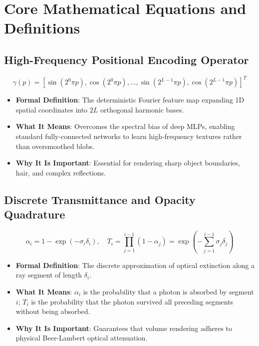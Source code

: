 \documentclass[11pt,a4paper]{article}
\theoremstyle{definition}
\begin{document}
\section{Core Mathematical Equations and Definitions}

\subsection{High-Frequency Positional Encoding Operator}
{\boldmath
\begin{equation}
\gamma(p) = \left[ \sin(2^0 \pi p), \cos(2^0 \pi p), \dots, \sin(2^{L-1} \pi p), \cos(2^{L-1} \pi p) \right]^T
\end{equation}
}
\begin{itemize}
    \item \textbf{Formal Definition}: The deterministic Fourier feature map expanding 1D spatial coordinates into $2L$ orthogonal harmonic bases.
    \item \textbf{What It Means}: Overcomes the spectral bias of deep MLPs, enabling standard fully-connected networks to learn high-frequency textures rather than oversmoothed blobs.
    \item \textbf{Why It Is Important}: Essential for rendering sharp object boundaries, hair, and complex reflections.
\end{itemize}

\subsection{Discrete Transmittance and Opacity Quadrature}
{\boldmath
\begin{equation}
\alpha_i = 1 - \exp(-\sigma_i \delta_i), \quad T_i = \prod_{j=1}^{i-1} (1 - \alpha_j) = \exp\left( -\sum_{j=1}^{i-1} \sigma_j \delta_j \right)
\end{equation}
}
\begin{itemize}
    \item \textbf{Formal Definition}: The discrete approximation of optical extinction along a ray segment of length $\delta_i$.
    \item \textbf{What It Means}: $\alpha_i$ is the probability that a photon is absorbed by segment $i$; $T_i$ is the probability that the photon survived all preceding segments without being absorbed.
    \item \textbf{Why It Is Important}: Guarantees that volume rendering adheres to physical Beer-Lambert optical attenuation.
\end{itemize}
\end{document}
